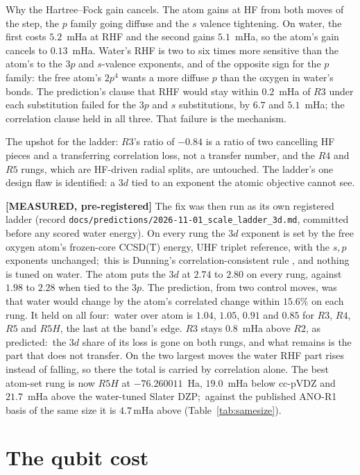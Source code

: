 \documentclass[aps,pra,twocolumn,superscriptaddress,longbibliography]{revtex4-2}
\newcommand{\gvq}[2]{#2}
\newcommand{\mHa}{\,\mathrm{mHa}}
\begin{document}
Why the Hartree--Fock gain cancels.  The atom gains at HF from both
moves of the step, the $p$ family going diffuse and the $s$ valence
tightening.  On water, the first costs $5.2$~mHa at RHF and the second
gains $5.1$~mHa, so the atom's gain cancels to $0.13$~mHa.  Water's RHF
is two to six times more sensitive than the atom's to the $3p$ and
$s$-valence exponents, and of the opposite sign for the $p$ family: the
free atom's $2p^{4}$ wants a more diffuse $p$ than the oxygen in water's
bonds.  The prediction's clause that RHF would stay within $0.2$~mHa of
$R3$ under each substitution failed for the $3p$ and $s$ substitutions,
by $6.7$ and $5.1$~mHa; the correlation clause held in all three.  That
failure is the mechanism.

The upshot for the ladder: $R3$'s ratio of $-0.84$ is a ratio of two
cancelling HF pieces and a transferring correlation loss, not a transfer
number, and the $R4$ and $R5$ rungs, which are HF-driven radial splits,
are untouched.  The ladder's one design flaw is identified: a $3d$ tied
to an exponent the atomic objective cannot see.

\textbf{[MEASURED, pre-registered]} The fix was then run as its own
registered ladder (record
\texttt{docs/predictions/2026-11-01\_scale\_ladder\_3d.md}, committed before any
scored water energy).  On every rung the $3d$ exponent is set by the free
oxygen atom's frozen-core CCSD(T) energy, UHF triplet reference, with the
$s,p$ exponents unchanged;\ this is Dunning's correlation-consistent rule
\cite{dunning1989}, and nothing is tuned on water.  The atom puts the $3d$
at $2.74$ to $2.80$ on every rung, against $1.98$ to $2.28$ when tied to the
$3p$.  The prediction, from two control moves, was that water would change
by the atom's correlated change within $15.6\%$ on each rung.  It held on
all four:\ water over atom is $1.04$, $1.05$, $0.91$ and $0.85$ for $R3$,
$R4$, $R5$ and $R5H$, the last at the band's edge.  $R3$ stays $0.8$~mHa above
$R2$, as predicted:\ the $3d$ share of its loss is gone on both rungs, and
what remains is the part that does not transfer.  On the two largest
moves the water RHF part rises instead of falling, so there the total is
carried by correlation alone.  The best atom-set rung is now $R5H$ at
\gvq{p62_r5h3d_fc}{$-76.260011$}~Ha, $19.0$~mHa below cc-pVDZ and $21.7$~mHa above the
water-tuned Slater DZP;\ against the published ANO-R1 basis of the same
size it is $\gvq{p62_r5h3d_above_anor1_mha}{4.7}\mHa$ above
(Table~\ref{tab:samesize}).

\section{The qubit cost}
\label{sec:qubit}
\end{document}

